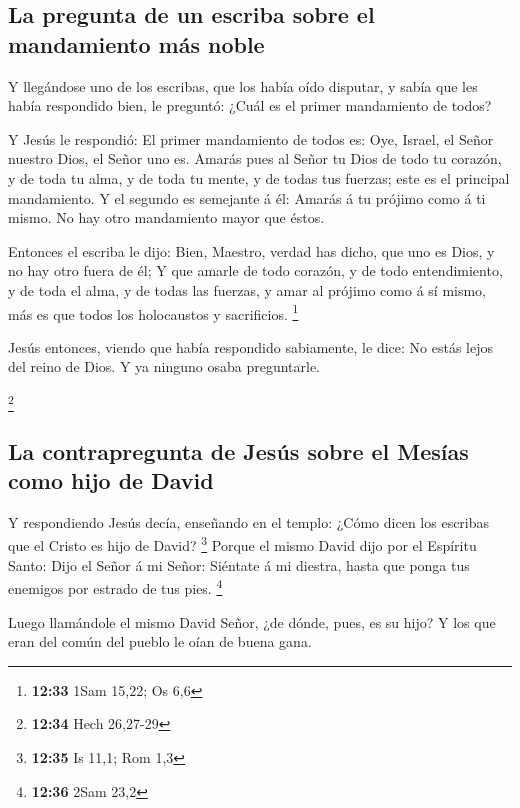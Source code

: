 \hypertarget{la-pregunta-de-un-escriba-sobre-el-mandamiento-muxe1s-noble}{%
\subsection{La pregunta de un escriba sobre el mandamiento más
noble}\label{la-pregunta-de-un-escriba-sobre-el-mandamiento-muxe1s-noble}}

 Y llegándose uno de los escribas, que los había oído
disputar, y sabía que les había respondido bien, le preguntó: ¿Cuál es
el primer mandamiento de todos?

 Y Jesús le respondió: El primer mandamiento de todos es:
Oye, Israel, el Señor nuestro Dios, el Señor uno es. 
Amarás pues al Señor tu Dios de todo tu corazón, y de toda tu alma, y de
toda tu mente, y de todas tus fuerzas; este es el principal mandamiento.
 Y el segundo es semejante á él: Amarás á tu prójimo como á
ti mismo. No hay otro mandamiento mayor que éstos.

 Entonces el escriba le dijo: Bien, Maestro, verdad has
dicho, que uno es Dios, y no hay otro fuera de él;  Y que
amarle de todo corazón, y de todo entendimiento, y de toda el alma, y de
todas las fuerzas, y amar al prójimo como á sí mismo, más es que todos
los holocaustos y sacrificios. \footnote{\textbf{12:33} 1Sam 15,22; Os
  6,6}

 Jesús entonces, viendo que había respondido sabiamente, le
dice: No estás lejos del reino de Dios. Y ya ninguno osaba preguntarle.

\footnote{\textbf{12:34} Hech 26,27-29}

\hypertarget{la-contrapregunta-de-jesuxfas-sobre-el-mesuxedas-como-hijo-de-david}{%
\subsection{La contrapregunta de Jesús sobre el Mesías como hijo de
David}\label{la-contrapregunta-de-jesuxfas-sobre-el-mesuxedas-como-hijo-de-david}}

 Y respondiendo Jesús decía, enseñando en el templo: ¿Cómo
dicen los escribas que el Cristo es hijo de David? \footnote{\textbf{12:35}
  Is 11,1; Rom 1,3}  Porque el mismo David dijo por el
Espíritu Santo: Dijo el Señor á mi Señor: Siéntate á mi diestra, hasta
que ponga tus enemigos por estrado de tus pies. \footnote{\textbf{12:36}
  2Sam 23,2}

 Luego llamándole el mismo David Señor, ¿de dónde, pues, es
su hijo? Y los que eran del común del pueblo le oían de buena gana.

